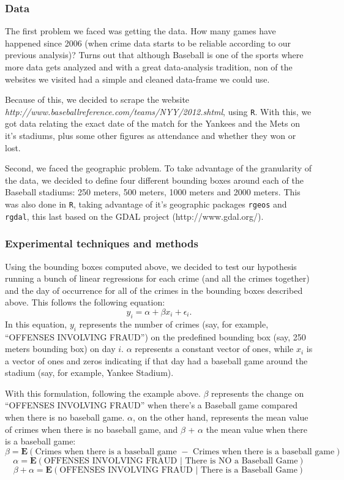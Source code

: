 \documentclass{article}
\begin{document}
\subsubsection{Data}
The first problem we faced was getting the data. How many games have happened since 2006 (when crime data starts to be reliable according to our previous analysis)? Turns out that although Baseball is one of the sports where more data gets analyzed and with a great data-analysis tradition, non of the websites we visited had a simple and cleaned data-frame we could use. 

Because of this, we decided to scrape the website \textit{http://www.baseball\-reference.com/teams/NYY/2012.shtml}, using \texttt{R}. With this, we got data relating the exact date of the match for the Yankees and the Mets on it's stadiums, plus some other figures as attendance and whether they won or lost. 

Second, we faced the geographic problem. To take advantage of the granularity of the data, we decided to define four different bounding boxes around each of the Baseball stadiums: 250 meters, 500 meters, 1000 meters and 2000 meters. This was also done in \texttt{R}, taking advantage of it's geographic packages \texttt{rgeos} and \texttt{rgdal}, this last based on the GDAL project (http://www.gdal.org/).

\subsubsection{Experimental techniques and methods}
Using the bounding boxes computed above, we decided to test our hypothesis running a bunch of linear regressions for each crime (and all the crimes together) and the day of occurrence for all of the crimes in the bounding boxes described above. This follows the following equation: $$y_{i} = \alpha + \beta x_{i} + \epsilon_{i}.$$ In this equation, $y_{i}$ represents the number of crimes (say, for example, ``OFFENSES INVOLVING FRAUD'') on the predefined bounding box (say, 250 meters bounding box) on day $i$. $\alpha$ represents a constant vector of ones, while $x_{i}$ is a vector of ones and zeros indicating if that day had a baseball game around the stadium (say, for example, Yankee Stadium).  

With this formulation, following the example above. $\beta$ represents the change on ``OFFENSES INVOLVING FRAUD'' when there's a Baseball game compared when there is no baseball game. $\alpha$, on the other hand, represents the mean value of crimes when there is no baseball game, and $\beta$ +  $\alpha$ the mean value when there is a baseball game: 
$$ \beta = \mathbf{E}\left(\text{Crimes when there is a baseball game } -  \text{ Crimes when there is a baseball game}\right)$$
$$\alpha = \mathbf{E}\left(\text{OFFENSES INVOLVING FRAUD } | \text{ There is NO a Baseball Game}\right)$$
$$\beta + \alpha = \mathbf{E}\left(\text{OFFENSES INVOLVING FRAUD } | \text{ There is a Baseball Game}\right)$$
\end{document}
